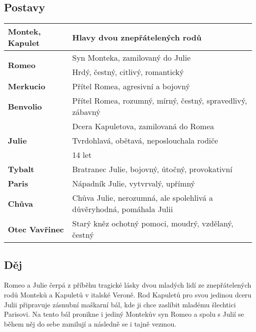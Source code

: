 \subsection*{Postavy}
\begin{tabularx}{\linewidth}{l|l}
    \textbf{Montek, Kapulet}           & Hlavy dvou znepřátelených rodů                                       \\
    \hline
    \multirow{2}{15em}{\textbf{Romeo}} & Syn Monteka, zamilovaný do Julie                                     \\
                                       & Hrdý, čestný, citlivý, romantický                                    \\
    \hline
    \textbf{Merkucio}                  & Přítel Romea, agresivní a bojovný                                    \\
    \hline
    \textbf{Benvolio}                  & Přítel Romea, rozumný, mírný, čestný, spravedlivý, zábavný           \\
    \hline
    \multirow{3}{15em}{\textbf{Julie}} & Dcera Kapuletova, zamilovaná do Romea                                \\
                                       & Tvrdohlavá, obětavá, neposlouchala rodiče                            \\
                                       & 14 let                                                               \\
    \hline
    \textbf{Tybalt}                    & Bratranec Julie, bojovný, útočný, provokativní                       \\
    \hline
    \textbf{Paris}                     & Nápadník Julie, vytvrvalý, upřímný                                   \\
    \hline
    \textbf{Chůva}                     & Chůva Julie, nerozumná, ale spolehlivá a důvěryhodná, pomáhala Julii \\
    \hline
    \textbf{Otec Vavřinec}             & Starý kněz ochotný pomoci, moudrý, vzdělaný, čestný                  \\
\end{tabularx}
\subsection*{Děj}
Romeo a Julie čerpá z příběhu tragické lásky dvou mladých lidí ze znepřátelených rodů Monteků a Kapuletů v italské Veroně.
Rod Kapuletů pro svou jedinou dceru Julii připravuje zásnubní maškarní bál, kde ji chce zaslíbit mladému šlechtici Parisovi.
Na tento bál pronikne i jediný Montekův syn Romeo a spolu s Julií se během něj do sebe zamilují a následně se i tajně vezmou.

